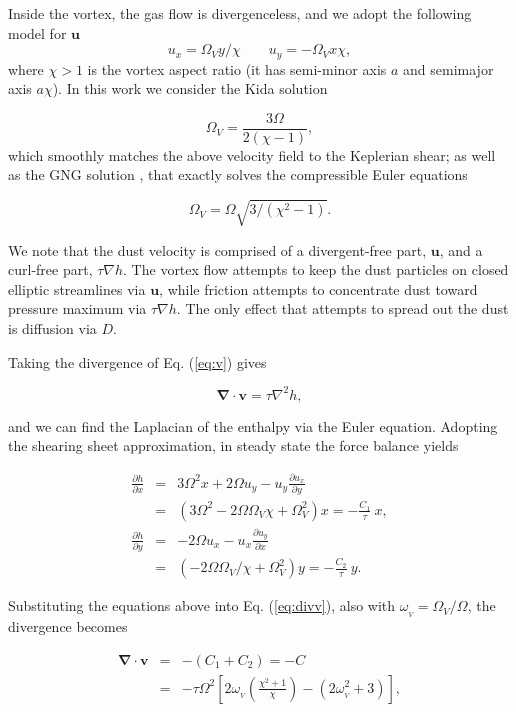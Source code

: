 \documentclass[apj]{emulateapj}
\newcommand{\pderiv}[2]{\frac{\partial #1}{\partial #2}}
\renewcommand{\v}[1]{{\boldsymbol{#1}}} %
\newcommand{\del}{\v{\nabla}}
\newcommand{\Div}{\del\cdot}
\newcommand{\Laplace}{\nabla^2}
\newcommand{\Eq}[1]{Eq. (\ref{#1})}
\newcommand{\eq}[1]{\Eq{#1}}
\newcommand{\beq}{\begin{equation}}
\newcommand{\eeq}{\end{equation}}
\newcommand{\beqn}{\begin{eqnarray}}
\newcommand{\eeqn}{\end{eqnarray}}
\begin{document}
Inside the vortex, the gas flow is divergenceless, and 
we adopt the following model for $\v{u}$
\beq
  u_x = \varOmega_V y / \chi \qquad  u_y= -\varOmega_V x \chi,
  \label{eq:vortex}
\eeq
\noindent where $\chi > 1$ is the vortex aspect ratio (it has
semi-minor axis $a$ and semimajor axis $a\chi$). In this work
we consider the Kida solution \citep{Kida81}

\beq
\varOmega_V = \frac{3\varOmega}{2(\chi-1)},  
\eeq
which smoothly matches the above velocity field to the Keplerian
shear; as well as the GNG solution \citep{Goodman87}, that exactly solves the 
compressible Euler equations 

\beq
\varOmega_V=\varOmega\sqrt{3/(\chi^2-1)}.
\eeq

We note that the dust
velocity is comprised of a divergent-free part, $\v{u}$, and a
curl-free part, $\tau\nabla{h}$. The vortex flow attempts to keep the
dust particles on closed elliptic streamlines via $\v{u}$, while friction
attempts to concentrate dust toward pressure maximum via $\tau\nabla
h$. The only effect that attempts to spread out the dust is diffusion
via $D$.  

Taking the divergence of
\eq{eq:v} gives 

\beq
\Div{\v{v}} = \tau \Laplace{h}, 
\label{eq:divv}
\eeq

\noindent and we can find the Laplacian of the enthalpy via the Euler
equation. Adopting the shearing sheet approximation, in steady state
the force balance yields  

\begin{eqnarray}
\pderiv{h}{x} &=& 3\varOmega^2 x + 2\varOmega u_y -
u_y\pderiv{u_x}{y} \nonumber \\
&=& \left(3\varOmega^2 - 2\varOmega\varOmega_V \chi + \varOmega_V^2\right) x
= -\frac{C_1}{\tau} \  x,  \\
\pderiv{h}{y} &=& - 2\varOmega u_x -
u_x\pderiv{u_y}{x} \nonumber \\
&=& \left(-2\varOmega\varOmega_V/\chi + \varOmega_V^2\right) y = -\frac{C_2}{\tau} \  y.
\end{eqnarray}

\noindent  Substituting the equations above into \eq{eq:divv}, also
with $\omega_{_V}=\varOmega_V/\varOmega$, the divergence becomes 

\beqn
\Div{\v{v}} &=& -(C_1+C_2) = - C \label{eq:const-div}\\
&=& - \tau\varOmega^2
\left[2\omega_{_V}\left(\frac{\chi^2+1}{\chi}\right) - (2\omega_{_V}^2
  + 3) \right], 
\label{eq:scale-div}
\eeqn
\end{document}
